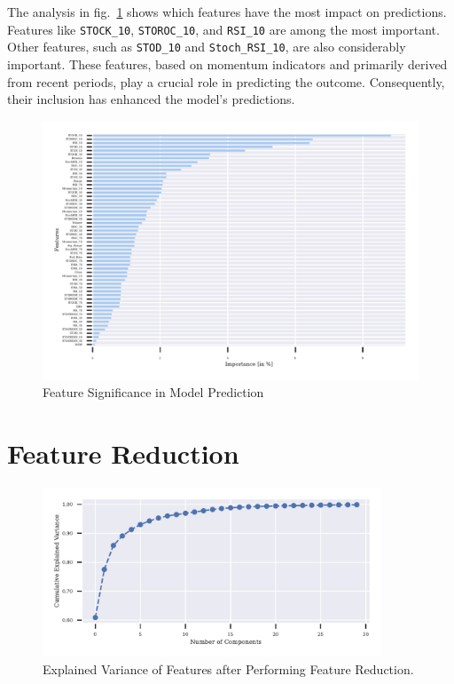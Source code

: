 The analysis in fig.~\ref{fig:feature_importance} shows which features have the most impact on predictions.
Features like \texttt{STOCK\_10}, \texttt{STOROC\_10}, and \texttt{RSI\_10} are among the most important.
Other features, such as \texttt{STOD\_10} and \texttt{Stoch\_RSI\_10}, are also considerably important.
These features, based on momentum indicators and primarily derived from recent periods, play a crucial role in predicting the outcome. Consequently, their inclusion has enhanced the model's predictions.
\begin{figure}[h]
\centering
\begin{adjustbox}{max width=1.2\textwidth,center}
\includegraphics[scale=1.2]{./pdf/report/feature_importance.pdf}
\end{adjustbox}
\caption{Feature Significance in Model Prediction}
\label{fig:feature_importance}
\end{figure}


\section{Feature Reduction}
\begin{figure}[h]
\centering
\includegraphics[width=0.9\textwidth]{./pdf/report/explained_variance.pdf}
\caption{Explained Variance of Features after Performing Feature Reduction.}
\label{fig:explained_variance}
\end{figure}

